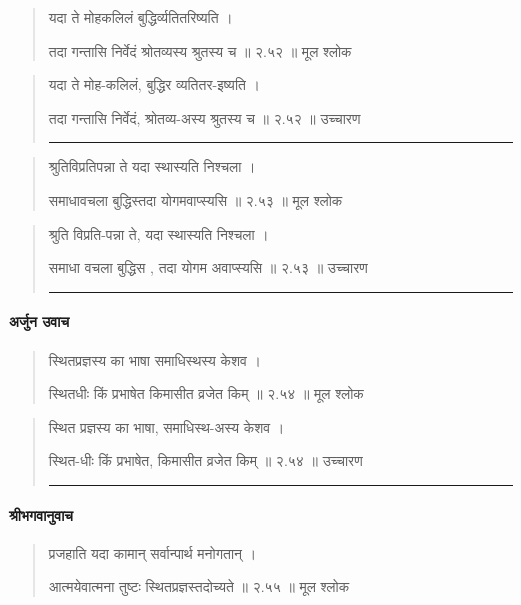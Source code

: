\begin{quotation}

यदा ते मोहकलिलं बुद्धिर्व्यतितरिष्यति  ।  

तदा गन्तासि निर्वेदं श्रोतव्यस्य श्रुतस्य च  ॥ २.५२ ॥  मूल श्लोक
\end{quotation}

\begin{quotation}

यदा ते मोह-कलिलं, बुद्धिर व्यतितर-इष्यति  ।  

तदा गन्तासि निर्वेदं, श्रोतव्य-अस्य श्रुतस्य च  ॥ २.५२ ॥  उच्चारण

\noindent\rule{16cm}{0.4pt} 
\end{quotation}


\begin{quotation}
श्रुतिविप्रतिपन्ना ते यदा स्थास्यति निश्चला  ।  

समाधावचला बुद्धिस्तदा योगमवाप्स्यसि  ॥ २.५३ ॥  मूल श्लोक
\end{quotation}

\begin{quotation}

श्रुति विप्रति-पन्ना ते, यदा स्थास्यति निश्चला  ।  

समाधा वचला बुद्धिस , तदा योगम अवाप्स्यसि  ॥ २.५३ ॥  उच्चारण

\noindent\rule{16cm}{0.4pt} 
\end{quotation}

\paragraph{\sanskrit अर्जुन उवाच}


\begin{quotation}

स्थितप्रज्ञस्य का भाषा समाधिस्थस्य केशव  ।  

स्थितधीः किं प्रभाषेत किमासीत व्रजेत किम्‌  ॥ २.५४ ॥  मूल श्लोक
\end{quotation}

\begin{quotation}

स्थित प्रज्ञस्य का भाषा, समाधिस्थ-अस्य केशव  ।  

स्थित-धीः किं प्रभाषेत, किमासीत व्रजेत किम्‌  ॥ २.५४ ॥  उच्चारण

\noindent\rule{16cm}{0.4pt} 
\end{quotation}

\paragraph{\sanskrit श्रीभगवानुवाच}
\begin{quotation}



प्रजहाति यदा कामान्‌ सर्वान्पार्थ मनोगतान्‌  ।  

आत्मयेवात्मना तुष्टः स्थितप्रज्ञस्तदोच्यते  ॥ २.५५ ॥  मूल श्लोक
\end{quotation}

